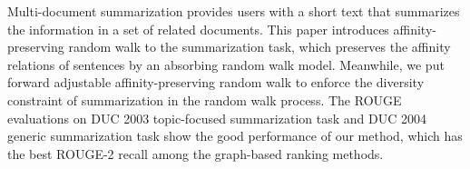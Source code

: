 Multi-document summarization provides users with a short text that summarizes the information in a set of related documents. This paper introduces affinity-preserving random walk to the summarization task, which preserves the affinity relations of sentences by an absorbing random walk model. Meanwhile, we put forward adjustable affinity-preserving random walk to enforce the diversity constraint of summarization in the random walk process. The ROUGE evaluations on DUC 2003 topic-focused summarization task and DUC 2004 generic summarization task show the good performance of our method, which has the best ROUGE-2 recall among the graph-based ranking methods.
